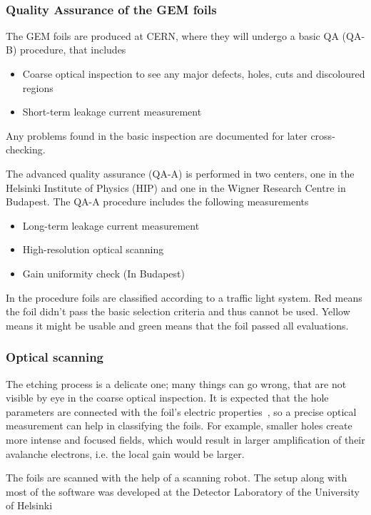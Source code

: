 ~\cite{TPCupgrade}

\subsubsection*{Quality Assurance of the GEM foils}
The GEM foils are produced at CERN, where they will undergo a basic QA (QA-B) procedure, that includes

\begin{itemize}
\item Coarse optical inspection to see any major defects, holes, cuts and discoloured regions
\item Short-term leakage current measurement
\end{itemize}

Any problems found in the basic inspection are documented for later cross-checking.


The advanced quality assurance (QA-A) is performed in two centers, one in the Helsinki Institute of Physics (HIP) and one in the Wigner Research Centre in Budapest. The QA-A procedure includes the following measurements

\begin{itemize}
\item Long-term leakage current measurement
\item High-resolution optical scanning
\item Gain uniformity check (In Budapest)
\end{itemize}

In the procedure foils are classified according to a traffic light system. Red means the foil didn't pass the basic selection criteria and thus cannot be used. Yellow means it might be usable and green means that the foil passed all evaluations.

\subsubsection{Optical scanning}
The etching process is a delicate one; many things can go wrong, that are not visible by eye in the coarse optical inspection. It is expected that the hole parameters are connected with the foil's electric properties~\cite{}, so a precise optical measurement can help in classifying the foils. For example, smaller holes create more intense and focused fields, which would result in larger amplification of their avalanche electrons, i.e. the local gain would be larger.

The foils are scanned with the help of a scanning robot. The setup along with most of the software was developed at the Detector Laboratory of the University of Helsinki~\cite{}

